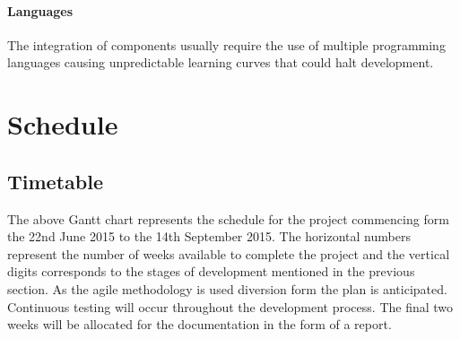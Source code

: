 \documentclass[a4paper, 11pt]{article}
\begin{document}
\paragraph{Languages}The integration of components usually require the use of multiple programming languages causing unpredictable learning curves that could halt development. 

\clearpage



\section{Schedule}

  \begin{gantt}{10}{12}
    \begin{ganttitle}
    \end{ganttitle}
  \end{gantt}
  

\subsection{Timetable}

The above Gantt chart represents the schedule for the project commencing form the 22nd June 2015 to the 14th September 2015. The horizontal numbers represent the number of weeks available to complete the project and the vertical digits corresponds to the stages of development mentioned in the previous section. As the agile methodology is used diversion form the plan is anticipated. Continuous testing will occur throughout the development process. The final two weeks will be allocated for the documentation in the form of a report. 

\vspace{\baselineskip}
\end{document}
